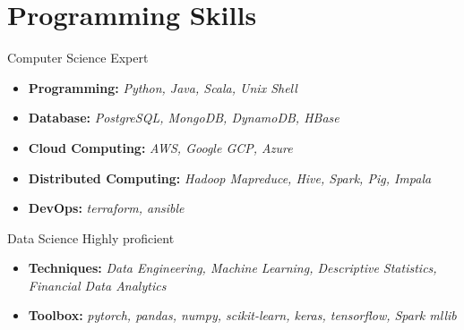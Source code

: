 \section{Programming Skills}\label{sec:programming-skills}

\resumeSubHeadingListStart
\resumeSubheading
{Computer Science}{}
{Expert}{}
\begin{itemize}
    \item \textbf{Programming:} \emph{Python, Java, Scala, Unix Shell}
    \item \textbf{Database:} \emph{PostgreSQL, MongoDB, DynamoDB, HBase}
    \item \textbf{Cloud Computing:} \emph{AWS, Google GCP, Azure}
    \item \textbf{Distributed Computing:} \emph{Hadoop Mapreduce, Hive, Spark, Pig, Impala}
    \item \textbf{DevOps:} \emph{terraform, ansible}
\end{itemize}

\resumeSubheading
{Data Science}{}
{Highly proficient}{}
\begin{itemize}
    \item \textbf{Techniques:} \emph{Data Engineering, Machine Learning, Descriptive Statistics, Financial Data Analytics}
    \item \textbf{Toolbox:} \emph{pytorch, pandas, numpy, scikit-learn, keras, tensorflow, Spark mllib}
\end{itemize}

\resumeSubHeadingListEnd